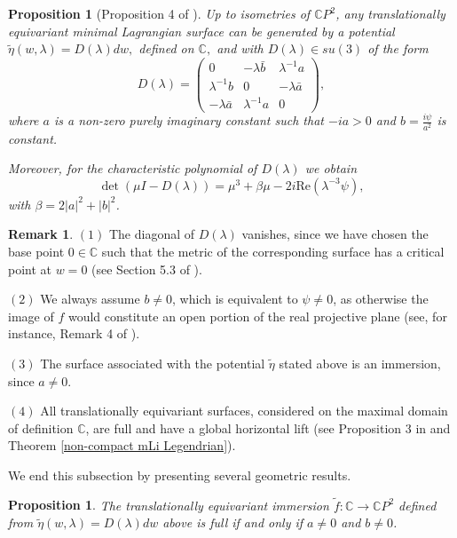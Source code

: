 \documentclass[a4paper,11pt]{amsart}
\newtheorem{proposition}[theorem]{Proposition}
\theoremstyle{definition}
\newtheorem{remark}{Remark}
\numberwithin{equation}{section}
\newcommand{\C}{\mathbb{C}}
\begin{document}
\begin{proposition} [Proposition 4 of \cite{DoMaNL}]
Up to isometries of $\mathbb{C}P^2$,  any translationally equivariant minimal Lagrangian surface 
can be generated by a potential $\tilde{\eta} (w, \lambda) = D(\lambda) dw,$ defined on $\C,$ and  with 
$D(\lambda) \in su(3)$ of the form 
\begin{equation}\label{eq:Delaunay}
D(\lambda)=\begin{pmatrix}0&-\lambda \bar{b}& \lambda^{-1}a\\
\lambda^{-1}b& 0& -\lambda \bar{a}\\
-\lambda \bar{a}& \lambda^{-1}a & 0
\end{pmatrix},
\end{equation}
where $a$ is a non-zero purely imaginary constant such that $-ia>0$ and   $b=\frac{i\psi}{a^2}$ is  
constant. 

Moreover, for the characteristic polynomial of $D(\lambda)$ we obtain
\begin{equation} \label{charpolD}
\det(\mu I-D(\lambda))=\mu^3+\beta \mu-2i \mathrm{Re}(\lambda^{-3}\psi),
\end{equation}
with $\beta=2|a|^2+|b|^2$.
\end{proposition}

\begin{remark} \label{a and b}
$(1)$ The diagonal of $D(\lambda)$ vanishes, since we have chosen the base point $0 \in \C$ such that the metric of the corresponding surface has a
critical point at $w = 0$ (see Section 5.3 of \cite{DoMaNL}).

$(2)$ We always assume $b \neq 0$, which is equivalent to  $\psi \neq 0$, 
as  otherwise the image of $f$ would constitute an open portion of the real projective plane (see, for instance, Remark 4 of \cite{DoMaNL}). 


$(3)$ The surface associated with the potential $\tilde{\eta}$ stated above is an immersion, since $a \neq 0$.

$(4)$ All translationally equivariant surfaces, considered on the maximal domain of 
definition $\mathbb{C}$,
are full and have a global horizontal lift  (see Proposition 3 in \cite{DoMaNL} and Theorem \ref{non-compact mLi Legendrian}).  
\end{remark}




We end this subsection by presenting several geometric results.

\begin{proposition}
The translationally equivariant immersion $\tilde{f}: \C \rightarrow \C P^2$ defined from 
$\tilde{\eta}(w,\lambda) = D(\lambda) dw$ above is 
full   if and only if $a\neq 0$ and $b\neq 0$.
\end{proposition}
\end{document}
